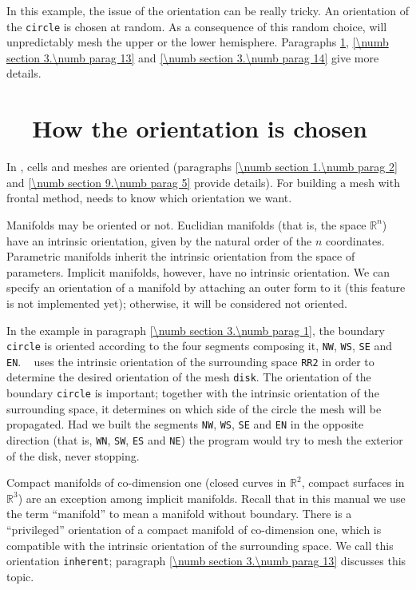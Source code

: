 In this example, the issue of the orientation can be really tricky.
An orientation of the {\small\tt circle} is chosen at random.
As a consequence of this random choice, {\maniFEM} will unpredictably mesh the upper or
the lower hemisphere.
Paragraphs \ref{\numb section 3.\numb parag 10}, \ref{\numb section 3.\numb parag 13} and
\ref{\numb section 3.\numb parag 14} give more details.


\section{~~How the orientation is chosen}\label{\numb section 3.\numb parag 10}

In \maniFEM, cells and meshes are oriented (paragraphs \ref{\numb section 1.\numb parag 2}
and \ref{\numb section 9.\numb parag 5} provide details).
For building a mesh with frontal method, {\maniFEM} needs to know which orientation we want.

Manifolds may be oriented or not.
Euclidian manifolds (that is, the space $ \mathbb{R}^n $) have an intrinsic orientation,
given by the natural order of the $n$ coordinates.
Parametric manifolds inherit the intrinsic orientation from the space of parameters.
Implicit manifolds, however, have no intrinsic orientation.
We can specify an orientation of a manifold by attaching an outer form to it
(this feature is not implemented yet); otherwise, it will be considered not oriented.

In the example in paragraph \ref{\numb section 3.\numb parag 1}, the boundary {\small\tt circle}
is oriented according to the four segments composing it, {\small\tt NW}, {\small\tt WS},
{\small\tt SE} and {\small\tt EN}.
\ {\ManiFEM} uses the intrinsic orientation of the surrounding space {\small\tt RR2} in order
to determine the desired orientation of the mesh {\small\tt disk}.
The orientation of the boundary {\small\tt circle} is important;
together with the intrinsic orientation of the surrounding space,
it determines on which side of the circle the mesh will be propagated.
Had we built the segments {\small\tt NW}, {\small\tt WS}, {\small\tt SE} and {\small\tt EN} in the
opposite direction (that is, {\small\tt WN}, {\small\tt SW}, {\small\tt ES} and {\small\tt NE})
the program would try to mesh the exterior of the disk, never stopping.

Compact manifolds of co-dimension one (closed curves in $ \mathbb{R}^2 $,
compact surfaces in $ \mathbb{R}^3 $) are an exception among implicit manifolds.
Recall that in this manual we use the term ``manifold'' to mean a manifold without boundary.
There is a ``privileged'' orientation of a compact manifold of co-dimension one,
which is compatible with the intrinsic orientation of the surrounding space.
We call this orientation {\small\tt inherent}; paragraph \ref{\numb section 3.\numb parag 13}
discusses this topic.

